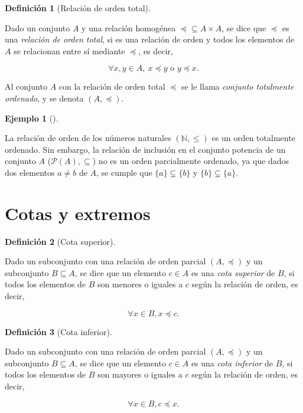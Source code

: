\documentclass[
  a4paper,
]{scrreport}
\theoremstyle{definition}
\newtheorem{example}{Ejemplo}[chapter]
\theoremstyle{plain}
\theoremstyle{plain}
\theoremstyle{plain}
\theoremstyle{definition}
\newtheorem{definition}{Definición}[chapter]
\theoremstyle{remark}
\begin{document}
\begin{definition}[Relación de orden
total]\protect\hypertarget{def-relacion-orden-total}{}\label{def-relacion-orden-total}

Dado un conjunto \(A\) y una relación homogénea
\(\preceq \subseteq A \times A\), se dice que \(\preceq\) es una
\emph{relación de orden total}, si es una relación de orden y todos los
elementos de \(A\) se relacionan entre sí mediante \(\preceq\), es
decir,

\[\forall x, y\in A,\ x\preceq y \mbox{ o } y \preceq x.\]

Al conjunto \(A\) con la relación de orden total \(\preceq\) se le llama
\emph{conjunto totalmente ordenado}, y se denota \((A,\preceq)\).

\end{definition}

\begin{example}[]\protect\hypertarget{exm-relacion-orden-total}{}\label{exm-relacion-orden-total}

La relación de orden de los números naturales \((\mathbb{N},\leq)\) es
un orden totalmente ordenado. Sin embargo, la relación de inclusión en
el conjunto potencia de un conjunto \(A\) (\(\mathcal{P}(A),\subseteq\))
no es un orden parcialmente ordenado, ya que dados dos elementos
\(a\neq b\) de \(A\), se cumple que \(\{a\}\subsetneq \{b\}\) y
\(\{b\}\subsetneq \{a\}\).

\end{example}

\hypertarget{cotas-y-extremos}{%
\section{Cotas y extremos}\label{cotas-y-extremos}}

\begin{definition}[Cota
superior]\protect\hypertarget{def-cota-superior-conjunto}{}\label{def-cota-superior-conjunto}

Dado un subconjunto con una relación de orden parcial \((A,\preceq)\) y
un subconjunto \(B\subseteq A\), se dice que un elemento \(c\in A\) es
una \emph{cota superior} de \(B\), si todos los elementos de \(B\) son
menores o iguales a \(c\) según la relación de orden, es decir,

\[\forall x \in B, x\preceq c.\]

\end{definition}

\begin{definition}[Cota
inferior]\protect\hypertarget{def-cota-inferior-conjunto}{}\label{def-cota-inferior-conjunto}

Dado un subconjunto con una relación de orden parcial \((A,\preceq)\) y
un subconjunto \(B\subseteq A\), se dice que un elemento \(c\in A\) es
una \emph{cota inferior} de \(B\), si todos los elementos de \(B\) son
mayores o iguales a \(c\) según la relación de orden, es decir,

\[\forall x \in B, c\preceq x.\]

\end{definition}
\end{document}
